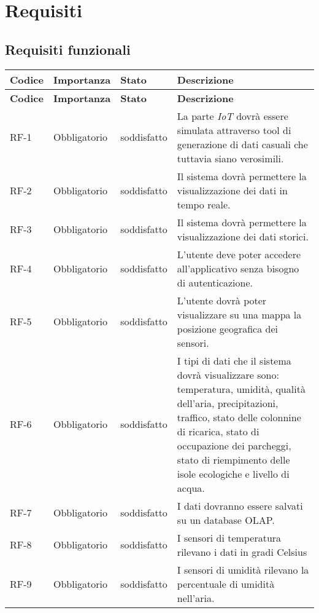 
\section{Requisiti}
\subsection{Requisiti funzionali}
\begin{longtable}{|>{\centering\arraybackslash}m{}|>{\centering\arraybackslash}m{}|>{\centering\arraybackslash}m{}|>{\centering\arraybackslash}m{}|}
	\hline
	\textbf{Codice} & \textbf{Importanza} & \textbf{Stato}& \textbf{Descrizione}\\\hline
	\endfirsthead
	\hline
	\textbf{Codice} & \textbf{Importanza} & \textbf{Stato}& \textbf{Descrizione}\\\hline
	\endhead
	\hline
	RF-1            & Obbligatorio        & soddisfatto & La parte \textit{IoT} dovrà essere simulata attraverso tool di generazione di dati casuali che tuttavia siano verosimili.
	\\\hline
	RF-2            & Obbligatorio        & soddisfatto & Il sistema dovrà permettere la visualizzazione dei dati in tempo reale.
	\\\hline
	RF-3            & Obbligatorio        & soddisfatto & Il sistema dovrà permettere la visualizzazione dei dati storici.
	\\\hline
	RF-4            & Obbligatorio        & soddisfatto & L'utente deve poter accedere all'applicativo senza bisogno di autenticazione.
	\\\hline
	RF-5            & Obbligatorio        & soddisfatto & L'utente dovrà poter visualizzare su una mappa la posizione geografica dei sensori.
	\\\hline
	RF-6            & Obbligatorio        & soddisfatto & I tipi di dati che il sistema dovrà visualizzare sono: temperatura, umidità, qualità dell'aria, precipitazioni, traffico, stato delle colonnine di ricarica, stato di occupazione dei parcheggi, stato di riempimento delle isole ecologiche e livello di acqua.
	\\\hline
	RF-7            & Obbligatorio        & soddisfatto & I dati dovranno essere salvati su un database OLAP.
	\\\hline
	RF-8            & Obbligatorio        & soddisfatto & I sensori di temperatura rilevano i dati in gradi Celsius
	\\\hline
	RF-9            & Obbligatorio        & soddisfatto & I sensori di umidità rilevano la percentuale di umidità nell’aria.

\end{longtable}
